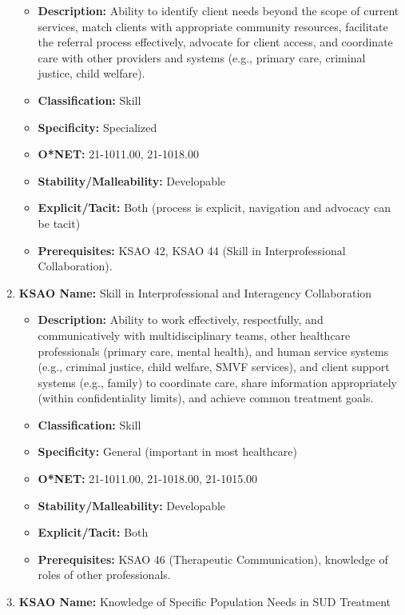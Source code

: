 \documentclass[
  letterpaper,
  DIV=11,
  numbers=noendperiod]{scrartcl}
\providecommand{\tightlist}{%
  \setlength{\itemsep}{0pt}\setlength{\parskip}{0pt}}
\begin{document}
\begin{enumerate}
  \begin{itemize}
  \tightlist
  \item
    \textbf{Description:} Ability to identify client needs beyond the
    scope of current services, match clients with appropriate community
    resources, facilitate the referral process effectively, advocate for
    client access, and coordinate care with other providers and systems
    (e.g., primary care, criminal justice, child welfare).
  \item
    \textbf{Classification:} Skill
  \item
    \textbf{Specificity:} Specialized
  \item
    \textbf{O*NET:} 21-1011.00, 21-1018.00
  \item
    \textbf{Stability/Malleability:} Developable
  \item
    \textbf{Explicit/Tacit:} Both (process is explicit, navigation and
    advocacy can be tacit)
  \item
    \textbf{Prerequisites:} KSAO 42, KSAO 44 (Skill in Interprofessional
    Collaboration).
  \end{itemize}
\item
  \textbf{KSAO Name:} Skill in Interprofessional and Interagency
  Collaboration

  \begin{itemize}
  \tightlist
  \item
    \textbf{Description:} Ability to work effectively, respectfully, and
    communicatively with multidisciplinary teams, other healthcare
    professionals (primary care, mental health), and human service
    systems (e.g., criminal justice, child welfare, SMVF services), and
    client support systems (e.g., family) to coordinate care, share
    information appropriately (within confidentiality limits), and
    achieve common treatment goals.
  \item
    \textbf{Classification:} Skill
  \item
    \textbf{Specificity:} General (important in most healthcare)
  \item
    \textbf{O*NET:} 21-1011.00, 21-1018.00, 21-1015.00
  \item
    \textbf{Stability/Malleability:} Developable
  \item
    \textbf{Explicit/Tacit:} Both
  \item
    \textbf{Prerequisites:} KSAO 46 (Therapeutic Communication),
    knowledge of roles of other professionals.
  \end{itemize}
\item
  \textbf{KSAO Name:} Knowledge of Specific Population Needs in SUD
  Treatment


\end{enumerate}
\end{document}
